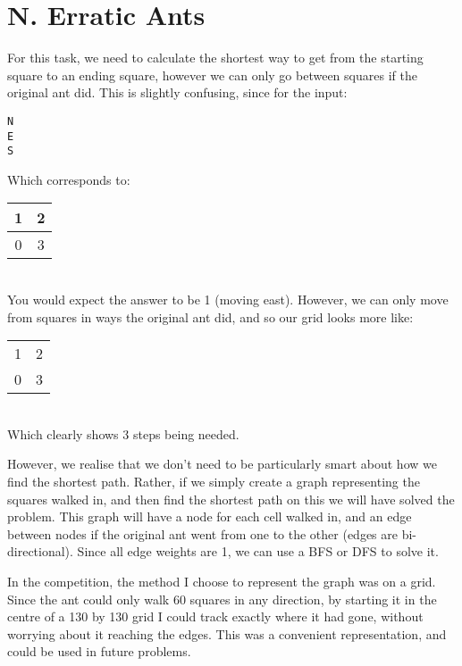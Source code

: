 \section*{N. Erratic Ants}

For this task, we need to calculate the shortest way to get from the starting square to an ending square, however we can only go between squares if the original ant did. This is slightly confusing, since for the input:
\begin{verbatim}
N
E
S
\end{verbatim}
Which corresponds to:
\\
\begin{tabular}{ | c | c | }
\hline
1 & 2 \\ \hline
0 & 3 \\ \hline
\end{tabular}
\\
You would expect the answer to be 1 (moving east). However, we can only move from squares in ways the original ant did, and so our grid looks more like:
\\
\begin{tabular}{ | c | c | }
\hline
\multicolumn{1}{|c}{1} & 2 \\
0 & 3 \\ \hline
\end{tabular}
\\
Which clearly shows 3 steps being needed.

However, we realise that we don't need to be particularly smart about how we find the shortest path. Rather, if we simply create a graph representing the squares walked in, and then find the shortest path on this we will have solved the problem. This graph will have a node for each cell walked in, and an edge between nodes if the original ant went from one to the other (edges are bi-directional). Since all edge weights are 1, we can use a BFS or DFS to solve it.

In the competition, the method I choose to represent the graph was on a grid. Since the ant could only walk 60 squares in any direction, by starting it in the centre of a 130 by 130 grid I could track exactly where it had gone, without worrying about it reaching the edges. This was a convenient representation, and could be used in future problems.
